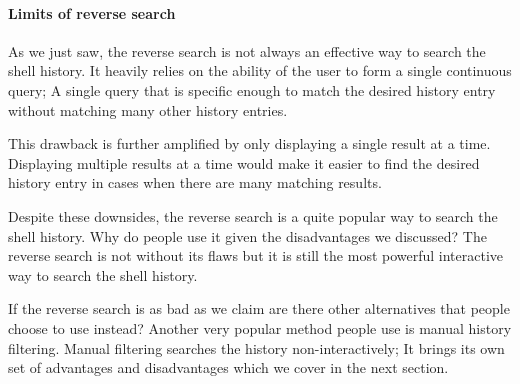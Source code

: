 \paragraph{Limits of reverse search}

As we just saw, the reverse search is not always an effective way to search the shell history. It heavily relies on the ability of the user to form a single continuous query; A single query that is specific enough to match the desired history entry without matching many other history entries. 

This drawback is further amplified by only displaying a single result at a time. Displaying multiple results at a time would make it easier to find the desired history entry in cases when there are many matching results. 

Despite these downsides, the reverse search is a quite popular way to search the shell history. Why do people use it given the disadvantages we discussed? The reverse search is not without its flaws but it is still the most powerful interactive way to search the shell history. %

If the reverse search is as bad as we claim are there other alternatives that people choose to use instead? Another very popular method people use is manual history filtering. Manual filtering searches the history non-interactively; It brings its own set of advantages and disadvantages which we cover in the next section.




